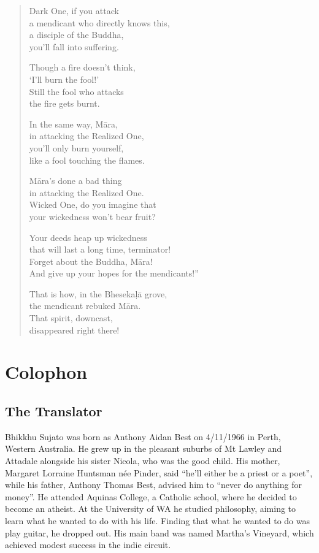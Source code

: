 \documentclass[12pt,openany]{book}%
\let\oldbackmatter\backmatter
\renewcommand{\backmatter}{%
\chapterfont{\setstretch{.85}\normalfont\centering}%
\sectionfont{\setstretch{.85}\Semiboldsubheadfont}%
\oldbackmatter}
\begin{document}
\begin{verse}
Dark One, if you attack \\
a mendicant who directly knows this, \\
a disciple of the Buddha, \\
you’ll fall into suffering. 

Though a fire doesn’t think, \\
‘I’ll burn the fool!’ \\
Still the fool who attacks \\
the fire gets burnt. 

In the same way, \textsanskrit{Māra}, \\
in attacking the Realized One, \\
you’ll only burn yourself, \\
like a fool touching the flames. 

\textsanskrit{Māra}’s done a bad thing \\
in attacking the Realized One. \\
Wicked One, do you imagine that \\
your wickedness won’t bear fruit? 

Your deeds heap up wickedness \\
that will last a long time, terminator! \\
Forget about the Buddha, \textsanskrit{Māra}! \\
And give up your hopes for the mendicants!” 

That is how, in the \textsanskrit{Bhesekaḷā} grove, \\
the mendicant rebuked \textsanskrit{Māra}. \\
That spirit, downcast, \\
disappeared right there! 

%
\end{verse}

%
\backmatter%
\chapter*{Colophon}

\section*{The Translator}

Bhikkhu Sujato was born as Anthony Aidan Best on 4/11/1966 in Perth, Western Australia. He grew up in the pleasant suburbs of Mt Lawley and Attadale alongside his sister Nicola, who was the good child. His mother, Margaret Lorraine Huntsman née Pinder, said “he’ll either be a priest or a poet”, while his father, Anthony Thomas Best, advised him to “never do anything for money”. He attended Aquinas College, a Catholic school, where he decided to become an atheist. At the University of WA he studied philosophy, aiming to learn what he wanted to do with his life. Finding that what he wanted to do was play guitar, he dropped out. His main band was named Martha’s Vineyard, which achieved modest success in the indie circuit. 
\end{document}
